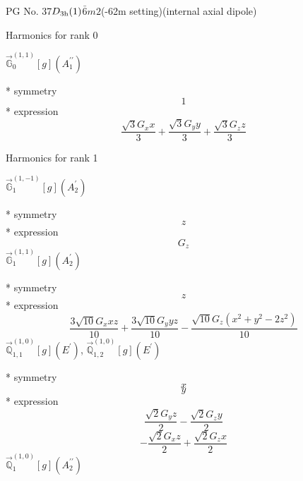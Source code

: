 \documentclass[fleqn,8pt]{jsarticle}
\begin{document}
\setcounter{MaxMatrixCols}{32}

\renewcommand{\tablename}{Table~}
\renewcommand{\figurename}{Figure~}
\begin{center}
\LARGE
PG No. 37\quad$D_{\rm 3h}(1)$\quad$\bar{6}m2$\quad(-62m setting)\quad[ hexagonal ] (internal axial dipole)
\end{center}

\noindent * Harmonics for rank 0

\noindent\quad $\vec{\mathbb{G}}_{0}^{(1,1)}[g](A_{1}^{\prime\prime})$

\noindent\quad ** symmetry
\begin{dmath*}
1
\end{dmath*}
\noindent\quad ** expression
\begin{dmath*}
\frac{\sqrt{3} G_{x} x}{3} + \frac{\sqrt{3} G_{y} y}{3} + \frac{\sqrt{3} G_{z} z}{3}
\end{dmath*}

\noindent * Harmonics for rank 1

\noindent\quad $\vec{\mathbb{G}}_{1}^{(1,-1)}[g](A_{2}^{\prime})$

\noindent\quad ** symmetry
\begin{dmath*}
z
\end{dmath*}
\noindent\quad ** expression
\begin{dmath*}
G_{z}
\end{dmath*}
\noindent\quad $\vec{\mathbb{G}}_{1}^{(1,1)}[g](A_{2}^{\prime})$

\noindent\quad ** symmetry
\begin{dmath*}
z
\end{dmath*}
\noindent\quad ** expression
\begin{dmath*}
\frac{3 \sqrt{10} G_{x} x z}{10} + \frac{3 \sqrt{10} G_{y} y z}{10} - \frac{\sqrt{10} G_{z} \left(x^{2} + y^{2} - 2 z^{2}\right)}{10}
\end{dmath*}
\noindent\quad $\vec{\mathbb{Q}}_{1,1}^{(1,0)}[g](E^{\prime})$, $\vec{\mathbb{Q}}_{1,2}^{(1,0)}[g](E^{\prime})$

\noindent\quad ** symmetry
\begin{dmath*}
x
\end{dmath*}
\begin{dmath*}
y
\end{dmath*}
\noindent\quad ** expression
\begin{dmath*}
\frac{\sqrt{2} G_{y} z}{2} - \frac{\sqrt{2} G_{z} y}{2}
\end{dmath*}
\begin{dmath*}
- \frac{\sqrt{2} G_{x} z}{2} + \frac{\sqrt{2} G_{z} x}{2}
\end{dmath*}
\noindent\quad $\vec{\mathbb{Q}}_{1}^{(1,0)}[g](A_{2}^{\prime\prime})$
\end{document}
